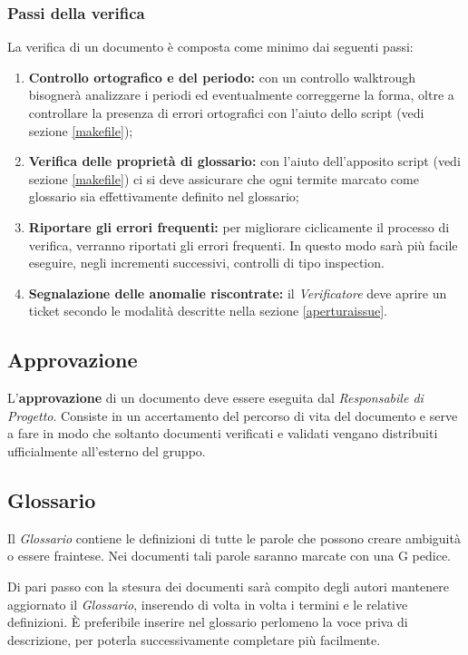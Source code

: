 	\subsubsection{Passi della verifica}
	La verifica di un documento è composta come minimo dai seguenti passi:
	\begin{enumerate}
		\item \textbf{Controllo ortografico e del periodo:} con un controllo walktrough bisognerà analizzare i periodi ed eventualmente correggerne la forma, oltre a controllare la presenza di errori ortografici con l'aiuto dello script  (vedi sezione \ref{makefile});
		\item \textbf{Verifica delle proprietà di glossario:} con l'aiuto dell'apposito script  (vedi sezione \ref{makefile}) ci si deve assicurare che ogni termite marcato come glossario sia effettivamente definito nel glossario; 
		\item \textbf{Riportare gli errori frequenti:} per migliorare ciclicamente il processo di verifica, verranno riportati gli errori frequenti. In questo modo sarà più facile eseguire, negli incrementi successivi, controlli di tipo inspection.
		\item \textbf{Segnalazione delle anomalie riscontrate:} il \emph{Verificatore} deve aprire un ticket secondo le modalità descritte nella sezione \ref{aperturaissue}.
	\end{enumerate}

\subsection{Approvazione}

L'\textbf{approvazione} di un documento deve essere eseguita dal \textit{Responsabile di Progetto}. Consiste in un accertamento del percorso di vita del documento e serve a fare in modo che soltanto documenti verificati e validati vengano distribuiti ufficialmente all'esterno del gruppo.

\subsection{Glossario}

Il \textit{Glossario} contiene le definizioni di tutte le parole che possono creare ambiguità o essere fraintese. Nei documenti tali parole saranno marcate con una G pedice.

Di pari passo con la stesura dei documenti sarà compito degli autori mantenere aggiornato il \textit{Glossario}, inserendo di volta in volta i termini e le relative definizioni. È preferibile inserire nel glossario perlomeno la voce priva di descrizione, per poterla successivamente completare più facilmente.